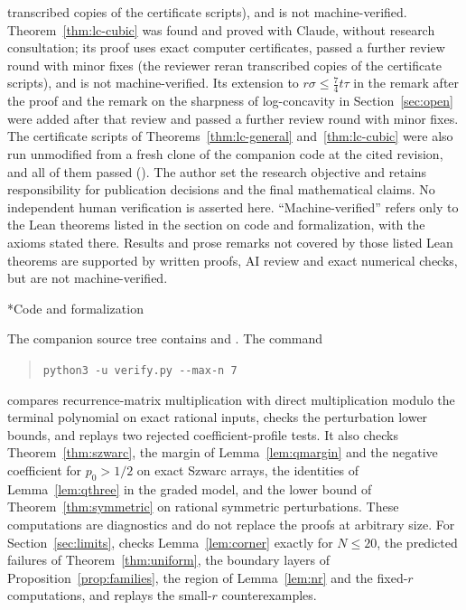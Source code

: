 \documentclass[twoside,10pt]{article}
\makeatletter
\numberwithin{equation}{section}
\theoremstyle{slbody}
\theoremstyle{definition}
\theoremstyle{remark}
\renewcommand{\section}{\@startsection{section}{1}{\z@}{-3.5ex \@plus -1ex \@minus -.2ex}{2.3ex \@plus .2ex}{\normalfont\large\bfseries}}
\makeatother
\begin{document}
transcribed copies of the certificate scripts), and is not machine-verified. Theorem~\ref{thm:lc-cubic} was found and proved with Claude, without research consultation; its proof uses exact computer certificates, passed a further review round with minor fixes (the reviewer reran transcribed copies of the certificate scripts), and is not machine-verified. Its extension to $r\sigma\leq\frac74t\tau$ in the remark after the proof and the remark on the sharpness of log-concavity in Section~\ref{sec:open} were added after that review and passed a further review round with minor fixes. The certificate scripts of Theorems~\ref{thm:lc-general} and~\ref{thm:lc-cubic} were also run unmodified from a fresh clone of the companion code at the cited revision, and all of them passed (). The author set the research objective and retains responsibility for publication decisions and the final mathematical claims. No independent human verification is asserted here. ``Machine-verified'' refers only to the Lean theorems listed in the section on code and formalization, with the axioms stated there. Results and prose remarks not covered by those listed Lean theorems are supported by written proofs, AI review and exact numerical checks, but are not machine-verified.

\section*{Code and formalization}

The companion source tree contains  and . The command
\begin{quote}\verb|python3 -u verify.py --max-n 7|\end{quote}
compares recurrence-matrix multiplication with direct multiplication modulo the terminal polynomial on exact rational inputs, checks the perturbation lower bounds, and replays two rejected coefficient-profile tests. It also checks Theorem~\ref{thm:szwarc}, the margin of Lemma~\ref{lem:qmargin} and the negative coefficient for $p_0>1/2$ on exact Szwarc arrays, the identities of Lemma~\ref{lem:qthree} in the graded model, and the lower bound of Theorem~\ref{thm:symmetric} on rational symmetric perturbations. These computations are diagnostics and do not replace the proofs at arbitrary size. For Section~\ref{sec:limits},  checks Lemma~\ref{lem:corner} exactly for $N\leq20$, the predicted failures of Theorem~\ref{thm:uniform}, the boundary layers of Proposition~\ref{prop:families}, the region of Lemma~\ref{lem:nr} and the fixed-$r$ computations, and  replays the small-$r$ counterexamples.
\end{document}
